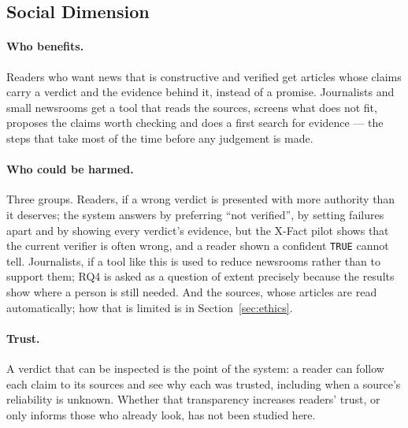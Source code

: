 
\subsection{Social Dimension}

\paragraph{Who benefits.} Readers who want news that is constructive
and verified get articles whose claims carry a verdict and the evidence
behind it, instead of a promise. Journalists and small newsrooms get a
tool that reads the sources, screens what does not fit, proposes the
claims worth checking and does a first search for evidence --- the
steps that take most of the time before any judgement is made.

\paragraph{Who could be harmed.} Three groups. Readers, if a wrong
verdict is presented with more authority than it deserves; the system
answers by preferring ``not verified'', by setting failures apart and
by showing every verdict's evidence, but the X-Fact pilot shows that
the current verifier is often wrong, and a reader shown a confident
\texttt{TRUE} cannot tell. Journalists, if a tool like this is used to
reduce newsrooms rather than to support them; RQ4 is asked as a
question of extent precisely because the results show where a person is
still needed. And the sources, whose articles are read automatically;
how that is limited is in Section~\ref{sec:ethics}.

\paragraph{Trust.} A verdict that can be inspected is the point of the
system: a reader can follow each claim to its sources and see why each
was trusted, including when a source's reliability is unknown. Whether
that transparency increases readers' trust, or only informs those who
already look, has not been studied here.
